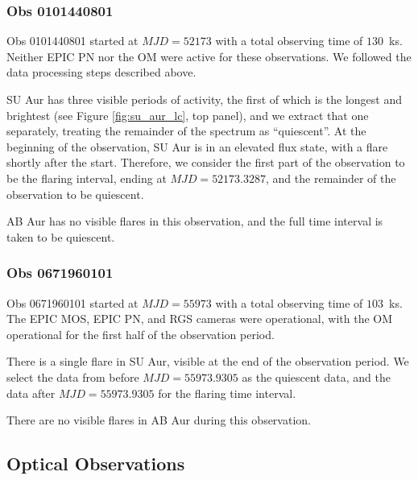 \documentclass[twocolumn]{aastex631}
\begin{document}
\subsubsection{Obs 0101440801}
Obs 0101440801 started at $MJD = 52173$ with a total observing time of $130$~ks. Neither EPIC PN nor the OM were active for these observations.
We followed the data processing steps described above.

SU Aur has three visible periods of activity, the first of which is the longest and brightest (see Figure \ref{fig:su_aur_lc}, top panel), and we extract that one separately, treating the remainder of the spectrum as ``quiescent''. At the beginning of the observation, SU Aur is in an elevated flux state, with a flare shortly after the start. Therefore, we consider the first part of the observation to be the flaring interval, ending at $MJD = 52173.3287$, and the remainder of the observation to be quiescent.

AB Aur has no visible flares in this observation, and the full time interval is taken to be quiescent.

\subsubsection{Obs 0671960101}  %
Obs 0671960101 started at $MJD = 55973$ with a total observing time of $103$~ks. The EPIC MOS, EPIC PN, and RGS cameras were operational, with the OM operational for the first half of the observation period. 

There is a single flare in SU Aur, visible at the end of the observation period. We select the data from before $MJD=55973.9305$ as the quiescent data, and the data after $MJD=55973.9305$ for the flaring time interval.

There are no visible flares in AB Aur during this observation. 

\subsection{Optical Observations}

\end{document}
